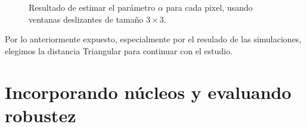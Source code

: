 \begin{figure}[htb]
\begin{minipage}[b]{0.55\linewidth}
		\caption{\small Resultado de estimar el parámetro $\alpha$ para cada pixel, usando ventanas deslizantes de tamaño  $3\times 3$.}
\end{minipage}
\end{figure}
		


Por lo anteriormente expuesto, especialmente por el resulado de las simulaciones, elegimos la distancia Triangular para continuar con el estudio.


\section{Incorporando núcleos y evaluando robustez}
\label{jstar}

